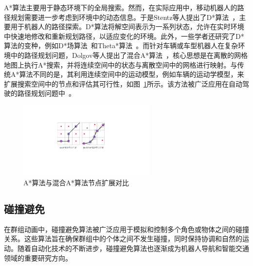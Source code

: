 A*算法主要用于静态环境下的全局搜索。然而，在实际应用中，移动机器人的路径规划需要进一步考虑到环境中的动态信息。于是Stentz等人提出了D*算法~\cite{stentz1994optimal}，主要用于机器人的路径探索。D*算法将解空间表示为一系列状态，允许在实时环境中快速地修改和重新规划路径，以适应变化的环境。此外，一些学者还研究了D*算法的变种，例如D*场算法~\cite{ferguson2006using}和Theta*算法~\cite{daniel2010theta, xiao2014improved}。而针对车辆或车型机器人在复杂环境中的路径规划问题，Dolgov等人提出了混合A*算法~\cite{dolgov2008practical}，核心思想是在离散的网格地图上执行A*搜索，并将连续空间中的状态与离散空间中的网格进行映射。与传统A*算法不同的是，其利用连续空间中的运动模型，例如车辆的运动学模型，来扩展搜索空间中的节点和评估其可行性，如图~\ref{fig:intro_hybridAstar}所示。该方法被广泛应用在自动驾驶的路径规划问题中~\cite{sedighi2019guided, dang2022improved}。

\begin{figure}[!tbh]
\centering
\includegraphics[width=0.61\textwidth]{figure/intro/hybridAstar.pdf}
\caption[A*算法与混合A*算法节点扩展对比]{
A*算法与混合A*算法节点扩展对比
}
\label{fig:intro_hybridAstar}
\end{figure}


\subsection{碰撞避免}


在群组动画中，碰撞避免算法被广泛应用于模拟和控制多个角色或物体之间的碰撞关系。这些算法旨在确保群组中的个体之间不发生碰撞，同时保持协调和自然的运动。随着自动化技术的不断进步，碰撞避免算法也逐渐成为机器人导航和智能交通领域的重要研究方向。

